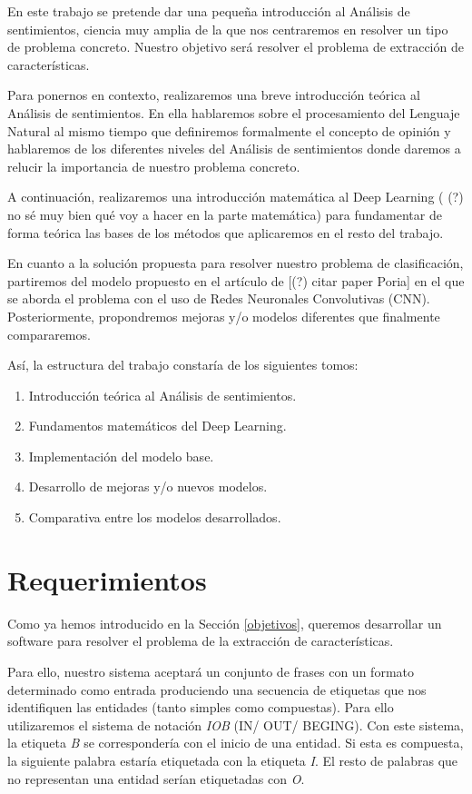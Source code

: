 	En este trabajo se pretende dar una pequeña introducción al Análisis de sentimientos, ciencia muy amplia de la que nos centraremos en resolver un tipo de problema concreto. Nuestro objetivo será resolver el problema de extracción de características.
	
	Para ponernos en contexto, realizaremos una breve introducción teórica al Análisis de sentimientos. En ella hablaremos sobre el procesamiento del Lenguaje Natural al mismo tiempo que definiremos formalmente el concepto de opinión y hablaremos de los diferentes niveles del Análisis de sentimientos donde daremos a relucir la importancia de nuestro problema concreto. 
	
	A continuación, realizaremos una introducción matemática al Deep Learning ( (?) no sé muy bien qué voy a hacer en la parte matemática) para fundamentar de forma teórica las bases de los métodos que aplicaremos en el resto del trabajo.
	
	En cuanto a la solución propuesta para resolver nuestro problema de clasificación, partiremos del modelo propuesto en el artículo de [(?) citar paper Poria]  en el que se aborda el problema con el uso de Redes Neuronales Convolutivas (CNN). Posteriormente, propondremos mejoras y/o modelos diferentes que finalmente compararemos.
	
	Así, la estructura del trabajo constaría de los siguientes tomos:
	
	 \begin{enumerate}
	 	\item Introducción teórica al Análisis de sentimientos.
	 	\item Fundamentos matemáticos del Deep Learning.
	 	\item Implementación del modelo base.
	 	\item Desarrollo de mejoras y/o nuevos modelos.
	 	\item Comparativa entre los modelos desarrollados.
	 \end{enumerate}

	 
	\section{Requerimientos}\label{requerimientos}
	
	Como ya hemos introducido en la Sección \ref{objetivos}, queremos desarrollar un software para resolver el problema de la extracción de características.
	
	Para ello, nuestro sistema aceptará un conjunto de frases con un formato determinado como entrada produciendo una secuencia de etiquetas que nos identifiquen las entidades (tanto simples como compuestas). Para ello utilizaremos el sistema de notación \textit{IOB} (IN/ OUT/ BEGING). Con este sistema, la etiqueta \textit{B} se correspondería con el inicio de una entidad. Si esta es compuesta, la siguiente palabra estaría etiquetada con la etiqueta \textit{I}. El resto de palabras que no representan una entidad serían etiquetadas con \textit{O}. 
	
